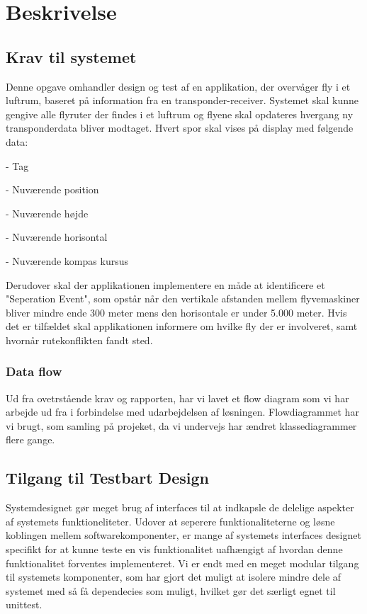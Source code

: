 \section{Beskrivelse}
\subsection{Krav til systemet}
Denne opgave omhandler design og test af en applikation, der overvåger fly i et luftrum, baseret på information fra en transponder-receiver. 
Systemet skal kunne gengive alle flyruter der findes i et luftrum og flyene skal opdateres hvergang ny transponderdata bliver modtaget. Hvert spor skal vises på display med følgende data: 

- Tag

- Nuværende position

- Nuværende højde

- Nuværende horisontal

- Nuværende kompas kursus

Derudover skal der applikationen implementere en måde at identificere et "Seperation Event", som opstår når den vertikale afstanden mellem flyvemaskiner bliver mindre ende 300 meter mens den horisontale er under 5.000 meter. 
Hvis det er tilfældet skal applikationen informere om hvilke fly der er involveret, samt hvornår rutekonflikten fandt sted.

\subsubsection{Data flow}
Ud fra ovetrstående krav og rapporten, har vi lavet et flow diagram som vi har arbejde ud fra i forbindelse med udarbejdelsen af løsningen. Flowdiagrammet har vi brugt, som samling på projeket, da vi undervejs har ændret klassediagrammer flere gange. 


\newpage
\subsection{Tilgang til Testbart Design}

Systemdesignet gør meget brug af interfaces til at indkapsle de delelige aspekter af systemets funktioneliteter. 
Udover at seperere funktionaliteterne og løsne koblingen mellem softwarekomponenter, er mange af systemets interfaces designet specifikt for at kunne teste en vis funktionalitet uafhængigt af hvordan denne funktionalitet forventes implementeret.
Vi er endt med en meget modular tilgang til systemets komponenter, som har gjort det muligt at isolere mindre dele af systemet med så få dependecies som muligt, hvilket gør det særligt egnet til unittest.

